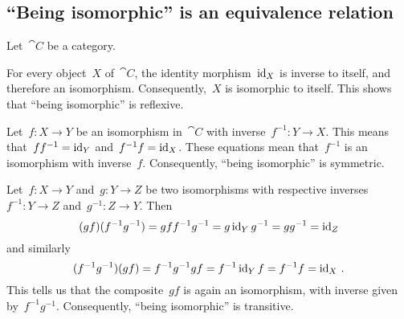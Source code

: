 \subsection{\enquote{Being isomorphic} is an equivalence relation}

Let~$\cat{C}$ be a category.

For every object~$X$ of~$\cat{C}$, the identity morphism~$\operatorname{id}_X$ is inverse to itself, and therefore an isomorphism.
Consequently,~$X$ is isomorphic to itself.
This shows that \enquote{being isomorphic} is reflexive.

Let~$f \colon X \to Y$ be an isomorphism in~$\cat{C}$ with inverse~$f^{-1} \colon Y \to X$.
This means that~$f f^{-1} = \operatorname{id}_Y$ and~$f^{-1} f = \operatorname{id}_X$.
These equations mean that~$f^{-1}$ is an isomorphism with inverse~$f$.
Consequently, \enquote{being isomorphic} is symmetric.

Let~$f \colon X \to Y$ and~$g \colon Y \to Z$ be two isomorphisms with respective inverses~$f^{-1} \colon Y \to Z$ and~$g^{-1} \colon Z \to Y$.
Then
\[
	(g f) (f^{-1} g^{-1})
	=
	g f f^{-1} g^{-1}
	=
	g \operatorname{id}_Y g^{-1}
	=
	g g^{-1}
	=
	\operatorname{id}_Z
\]
and similarly
\[
	(f^{-1} g^{-1}) (g f)
	=
	f^{-1} g^{-1} g f
	=
	f^{-1} \operatorname{id}_Y f
	=
	f^{-1} f
	=
	\operatorname{id}_X \,.
\]
This tells us that the composite~$g f$ is again an isomorphism, with inverse given by~$f^{-1} g^{-1}$.
Consequently, \enquote{being isomorphic} is transitive.
